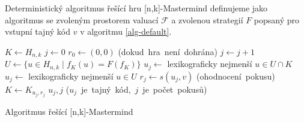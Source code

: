 \begin{definice}\label{defobecnyalg}
    Deterministický algoritmus řešící hru [n,k]-Mastermind definujeme jako algoritmus se zvoleným prostorem valuací $\mathcal{F}$ a zvolenou strategií $F$ popsaný pro vstupní tajný kód $v$ v algoritmu \ref{alg-default}. 
    
    
\end{definice}









\begin{algorithm}[h!]
\begin{algorithmic}[1]  %
    \State $K \gets H_{n,k}$ 
    \State $j \gets 0$
    \State $r_0 \gets (0,0)$
     \hfill \mbox{(dokud hra není dohrána)}
        \State $j \gets j + 1$ 
	\State $U \gets \{u \in H_{n,k} \mid f_K(u) = F(f_K)\}$
            \State $u_j \gets$ lexikograficky nejmenší $u \in U \cap K$
	\Else
		\State $u_j \gets$ lexikograficky nejmenší $u \in U$
	\EndIf
        \State $r_j \gets s(u_j, v)$ \hfill \mbox{(ohodnocení pokusu)}
        \State $K \gets K_{u_j,r_j}$
    \EndWhile
    \State \Return $u_j, j$ \hfill \mbox{($u_j$ je tajný kód, $j$ je počet pokusů)}
\EndFunction
\end{algorithmic}
\caption{Algoritmus řešící [n,k]-Mastermind}
\label{alg-default}
\end{algorithm}

